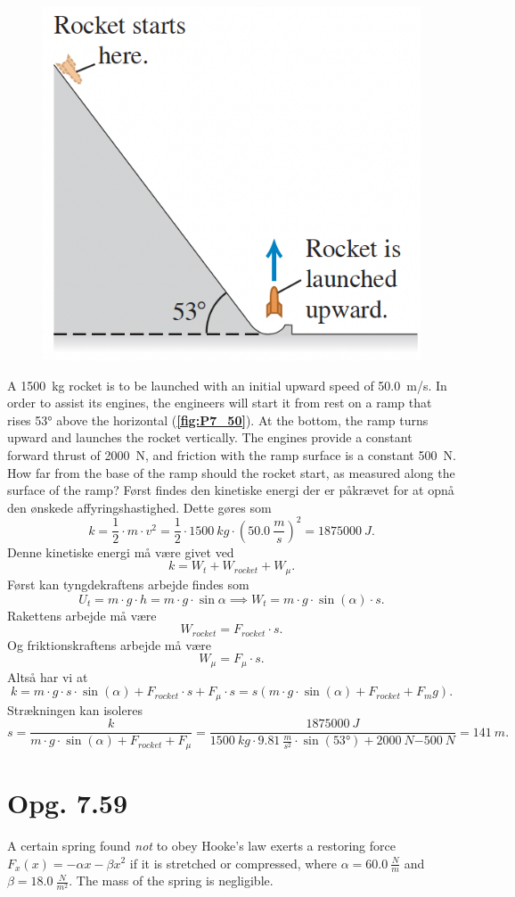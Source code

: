 \documentclass[12pt]{article}
\begin{document}
\begin{figure} [ht]
  \centering
  \caption{}
  \includegraphics[width=0.5\linewidth]{../figures/P7_50.png}
  \label{fig:P7_50}
\end{figure}

A \qty{1500}{kg} rocket is to be launched with an initial upward speed of \qty{50,0}{m/s}. In order to assist its engines, the engineers will start it from rest on a ramp that rises \ang{53} above the horizontal (\textbf{\autoref{fig:P7_50}}). At the bottom, the ramp turns upward and launches the rocket vertically. The engines provide a constant forward thrust of \qty{2000}{N}, and friction with the ramp surface is a constant \qty{500}{N}. How far from the base of the ramp should the rocket start, as measured along the surface of the ramp?
\bigbreak
Først findes den kinetiske energi der er påkrævet for at opnå den ønskede affyringshastighed. Dette gøres som
\[
k = \frac{1}{2}\cdot m\cdot v^2 = \frac{1}{2}\cdot \qty{1500}{kg}\cdot \left( \qty{50,0}{\frac{m}{s}} \right)^2 = \qty{1875000}{J}
.\] 
Denne kinetiske energi må være givet ved
\[
k = W_t + W_{rocket} + W_\mu
.\] 
Først kan tyngdekraftens arbejde findes som
\[
  U_t = m\cdot g\cdot h = m\cdot g\cdot \sin{\alpha} \implies W_t = m\cdot g\cdot \sin(\alpha)\cdot s
.\] 
Rakettens arbejde må være
\[
W_{rocket} = F_{rocket} \cdot s
.\] 
Og friktionskraftens arbejde må være
\[
W_\mu = F_{\mu} \cdot s
.\] 
Altså har vi at
\[
k = m \cdot g \cdot s \cdot \sin(\alpha) + F_{rocket} \cdot s + F_\mu \cdot s = s\left( m\cdot g\cdot \sin(\alpha) + F_{rocket} + F_mg \right) 
.\]
Strækningen kan isoleres
\[
s = \frac{k}{m\cdot g\cdot \sin(\alpha)+F_{rocket}+F_{\mu}} = \frac{\qty{1875000}{J}}{\qty{1500}{kg}\cdot \qty{9,81}{\frac{m}{s^2}\cdot \sin(\ang{53}) + \qty{2000}{N} \qty{-500}{N}}} = \qty{141}{m}
.\]



\section*{Opg. 7.59}
A certain spring found \textit{not} to obey Hooke’s law exerts a restoring force $F_x(x) = -\alpha x - \beta x^2$ if it is stretched or compressed,
where $\alpha = \qty{60,0}{\frac{N}{m}}$ and $\beta = \qty{18.0}{\frac{N}{m^2}}$. The mass of the spring is negligible. 
\end{document}
